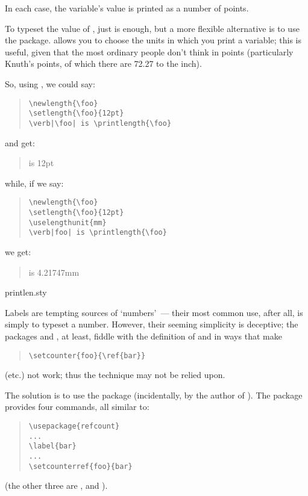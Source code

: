 In each case, the variable's value is printed as a number of points.

To typeset the value of , just
 is enough, but a more flexible alternative is
to use the  package.   allows you
to choose the units in which you print a variable; this is useful,
given that the most ordinary people don't think in points
(particularly Knuth's points, of which there are 72.27 to the inch).

So, using , we could say:
\begin{quote}
\begin{verbatim}
\newlength{\foo}
\setlength{\foo}{12pt}
\verb|\foo| is \printlength{\foo}
\end{verbatim}
\end{quote}
and get:
\begin{quote}
 is 12pt
\end{quote}
while, if we say:
\begin{quote}
\begin{verbatim}
\newlength{\foo}
\setlength{\foo}{12pt}
\uselengthunit{mm}
\verb|foo| is \printlength{\foo}
\end{verbatim}
\end{quote}
we get:
\begin{quote}
 is 4.21747mm
\end{quote}
\begin{ctanrefs}
\item[printlen.sty]
\end{ctanrefs}


Labels are tempting sources of `numbers'~--- their most common use,
after all, is simply to typeset a number.  However, their seeming
simplicity is deceptive; the packages  and
, at least, fiddle with the definition of
 and  in ways that make
\begin{quote}
\begin{verbatim}
\setcounter{foo}{\ref{bar}}
\end{verbatim}
\end{quote}
(etc.\@) not work; thus the technique may not be relied upon.

The solution is to use the  package (incidentally,
by the author of ).  The package provides four
commands, all similar to:
\begin{quote}
\begin{verbatim}
\usepackage{refcount}
...
\label{bar}
...
\setcounterref{foo}{bar}
\end{verbatim}
\end{quote}
(the other three are , 
and ).

